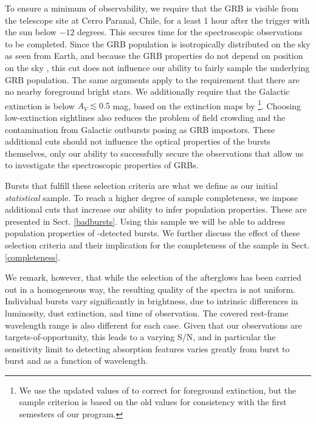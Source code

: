 \documentclass[longauth]{aa}    %
\begin{document}
To ensure a minimum of observability, we require that the GRB is visible from
the telescope site at Cerro Paranal, Chile, for a least 1 hour after the trigger
with the sun below $-12$ degrees. This secures time for the spectroscopic
observations to be completed. Since the GRB population is isotropically
distributed on the sky as seen from Earth, and because the GRB properties do not
depend on position on the sky \citep{Meegan1992, Briggs1996, Ukwatta2016}, this
cut does not influence our ability to fairly sample the underlying GRB
population. The same arguments apply to the requirement that there are no nearby
foreground bright stars. We additionally require that the Galactic extinction is
below $A_V \lesssim 0.5$ mag, based on the extinction maps by
\citet{Schlegel1998}\footnote{We use the updated values of \citet{Schlafly2011}
	to correct for foreground extinction, but the sample criterion is based on the
	old \citet{Schlegel1998} values for consistency with the first semesters of our
	program.}. Choosing low-extinction sightlines also reduces the problem of field
crowding and the contamination from Galactic outbursts posing as GRB impostors.
These additional cuts should not influence the optical properties of the bursts
themselves, only our ability to successfully secure the observations that allow
us to investigate the spectroscopic properties of GRBs.

Bursts that fulfill these selection criteria are what we define as our initial
\textit{statistical} sample. To reach a higher degree of sample completeness, we
impose additional cuts that increase our ability to infer population properties.
These are presented in Sect. \ref{badbursts}. Using this sample we will be able
to address population properties of \swift-detected bursts. We further discuss
the effect of these selection criteria and their implication for the
completeness of the sample in Sect. \ref{completeness}.

We remark, however, that while the selection of the afterglows has been carried
out in a homogeneous way, the resulting quality of the spectra is not uniform.
Individual bursts vary significantly in brightness, due to intrinsic
differences in luminosity, dust extinction, and time of observation. The covered
rest-frame wavelength range is also different for each case. Given that our
observations are targets-of-opportunity, this leads to a varying S/N, and in
particular the sensitivity limit to detecting absorption features varies greatly
from burst to burst and as a function of wavelength.
\end{document}
